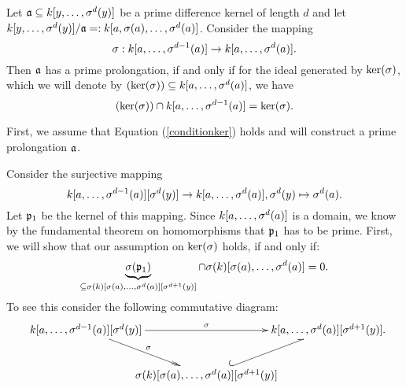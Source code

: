  
\begin{prop}
Let $\mathfrak{a} \subseteq k[y,\ldots,\sigma^d(y)]$ be a prime difference kernel of length $d$ and let $k[y,\ldots,\sigma^d(y)]/\mathfrak{a} =: k[a,\sigma(a),\ldots,\sigma^d(a)]$. Consider the mapping 
\[ \sigma: k[a,\ldots,\sigma^{d-1}(a)] \rightarrow k[a,\ldots,\sigma^d(a)]. \]
Then $\mathfrak{a}$ has a prime prolongation, if and only if for the ideal generated by $\operatorname{ker}(\sigma)$, which we will denote by $(\operatorname{ker}(\sigma)) \subseteq k[a,\ldots,\sigma^d(a)]$, we have \begin{equation}\label{conditionker} (\operatorname{ker}(\sigma)) \cap k[a,\ldots,\sigma^{d-1}(a)] = \operatorname{ker}(\sigma).\end{equation} 
\begin{bew}
First, we assume that Equation (\ref{conditionker}) holds and will construct a prime prolongation $\mathfrak{a}$.

Consider the surjective mapping 
\[ k[a,\ldots,\sigma^{d-1}(a)][\sigma^d(y)] \rightarrow k[a,\ldots,\sigma^d(a)], \sigma^d(y) \mapsto \sigma^d(a). \]
Let $\mathfrak{p}_1$ be the kernel of this mapping. Since $k[a,\ldots,\sigma^d(a)]$ is a domain, we know by the fundamental theorem on homomorphisms that $\mathfrak{p}_1$ has to be prime. 
First, we will show that our assumption on $\operatorname{ker}(\sigma)$ holds, if and only if:
\begin{equation}\label{skercapsk} \underbrace{\sigma(\mathfrak{p}_1)}_{\subseteq \sigma(k)[\sigma(a),\ldots,\sigma^d(a)][\sigma^{d+1}(y)]} \cap \sigma(k)[\sigma(a),\ldots,\sigma^d(a)] = 0. \end{equation}
To see this consider the following commutative diagram:
\[
\begin{xy}
\xymatrixcolsep{-1pc}
 \xymatrix{
      k[a,\ldots,\s^{d-1}(a)][\s^d(y)] \ar[rr]^\s \ar@{->>}[rd]^\s  &     &  k[a,\ldots,\s^d(a)][\s^{d+1}(y)]   \\
      &  \s(k)[\s(a),\ldots,\s^d(a)][\s^{d+1}(y)] \ar@^{(->}[ur] &  }
\end{xy}.
\]


\end{bew}
\end{prop}
